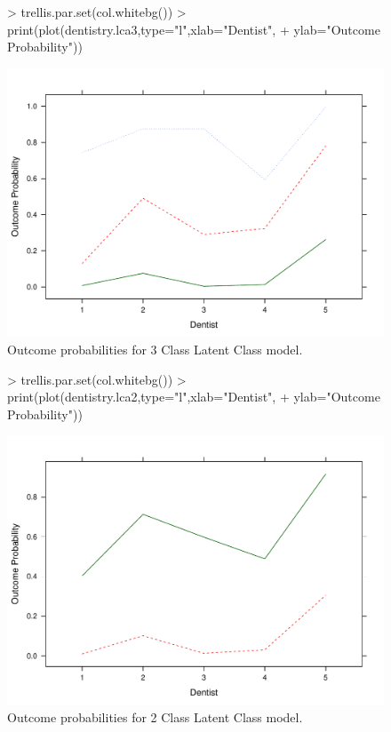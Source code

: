 \begin{figure}
  \centering
\begin{Schunk}
\begin{Sinput}
> trellis.par.set(col.whitebg())
> print(plot(dentistry.lca3,type="l",xlab="Dentist",
+     ylab="Outcome Probability"))
\end{Sinput}
\end{Schunk}
\includegraphics{randomLCA-example-014}
  \caption{Outcome probabilities for 3 Class Latent Class model.}
  \label{fig:outcome3}
\end{figure}

\begin{figure}
  \centering
\begin{Schunk}
\begin{Sinput}
> trellis.par.set(col.whitebg())
> print(plot(dentistry.lca2,type="l",xlab="Dentist",
+     ylab="Outcome Probability"))
\end{Sinput}
\end{Schunk}
\includegraphics{randomLCA-example-015}
  \caption{Outcome probabilities for 2 Class Latent Class model.}
  \label{fig:outcome2b}
\end{figure}

